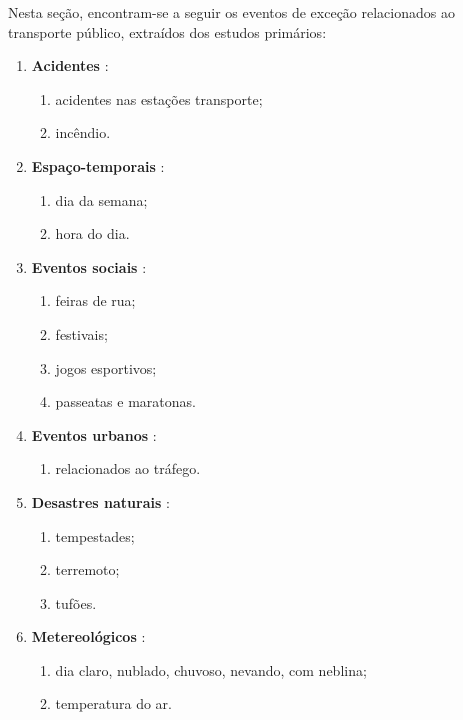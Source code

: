 \documentclass[
	12pt,				%
	oneside,			%
	a4paper,			%
	english,			%
	brazil				%
	]{abntex2ppgsi}
\begin{document}
{{{Nesta seção, encontram-se a seguir os eventos de exceção relacionados ao transporte público, extraídos dos estudos primários:

\begin{enumerate}
\item \textbf{Acidentes} \cite{Itoh2016}:
\begin{enumerate}
\item acidentes nas estações transporte;
\item incêndio.
\end{enumerate}

\item \textbf{Espaço-temporais}  \cite{Chen2016}:
\begin{enumerate}
\item dia da semana;
\item hora do dia.
\end{enumerate}

\item \textbf{Eventos sociais} \cite{Chen2016, Lecue2014, Gal-Tzur2014, Itoh2016}:
\begin{enumerate}
\item feiras de rua;
\item festivais;
\item jogos esportivos;
\item passeatas e maratonas.
\end{enumerate}

\item \textbf{Eventos urbanos} \cite{Chen2016, Lecue2014}:
\begin{enumerate}
\item relacionados ao tráfego.
\end{enumerate}

\item \textbf{Desastres naturais} \cite{Itoh2016}:
\begin{enumerate}
\item tempestades;
\item terremoto;
\item tufões.
\end{enumerate}

\item \textbf{Metereológicos} \cite{Chen2016}:
\begin{enumerate}
\item dia claro, nublado, chuvoso, nevando, com neblina;
\item temperatura do ar.
\end{enumerate}


\end{enumerate}}}}
\end{document}
